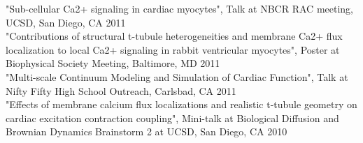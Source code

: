 \documentclass{res} %
\begin{document}
\begin{resume}
"Sub-cellular Ca2+ signaling in cardiac myocytes", Talk at NBCR RAC meeting, UCSD, San Diego, CA \hfill 2011 \\

"Contributions of structural t-tubule heterogeneities and membrane Ca2+ flux localization to local Ca2+ signaling in rabbit ventricular myocytes", Poster at Biophysical Society Meeting, Baltimore, MD  \hfill 2011 \\

"Multi-scale Continuum Modeling and Simulation of Cardiac Function", Talk at Nifty Fifty High School Outreach, Carlsbad, CA \hfill 2011 \\

"Effects of membrane calcium flux localizations and realistic t-tubule geometry on cardiac excitation contraction coupling", Mini-talk at Biological Diffusion and Brownian Dynamics Brainstorm 2 at UCSD, San Diego, CA \hfill 2010 \\


\end{resume} 
\end{document}
